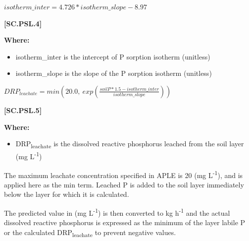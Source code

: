     \begin{center}
\(isotherm\_inter=4.726 * isotherm\_slope-8.97\)

    \end{center}
        \vspace{0.5cm} 
    
            {\raggedleft \textbf{[SC.PSL.4]}\par}
            \vspace{0.5cm}

        \textbf{Where:}
            
        \begin{itemize}
            \item isotherm\_inter is the intercept of P sorption isotherm (unitless)
            \item isotherm\_slope is the slope of the P sorption isotherm (unitless)

        \end{itemize}
        \vspace{0.5cm}
        
    \begin{center}
\(DRP_{leachate}=min(20.0,\ exp(\frac{soilP * 1.5-isotherm\_inter}{isotherm\_slope}))\)

    \end{center}
        \vspace{0.5cm} 
    
            {\raggedleft \textbf{[SC.PSL.5]}\par}
            \vspace{0.5cm}

        \textbf{Where:}
            
        \begin{itemize}
            \item DRP\textsubscript{leachate} is the dissolved reactive phosphorus leached from the soil layer (mg L\textsuperscript{-1})
        \end{itemize}
        \vspace{0.2cm}

The maximum leachate concentration specified in APLE is 20 (mg L\textsuperscript{-1}), and is applied here as the min term. Leached P is added to the soil layer immediately below the layer for which it is calculated.
\vspace{0.2cm}

The predicted value in (mg L\textsuperscript{-1}) is then converted to kg h\textsuperscript{-1} and the actual dissolved reactive phosphorus is expressed as the minimum of the layer labile P or the calculated DRP\textsubscript{leachate} to prevent negative values.
        \vspace{0.5cm}
        
